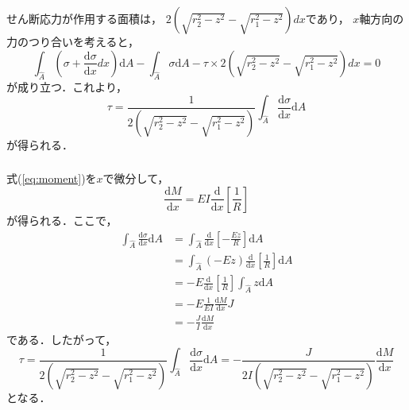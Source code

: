 \documentclass[a4paper]{jsarticle}
\begin{document}
\subsection{}
\subsubsection{}
せん断応力が作用する面積は，
$2\left(\sqrt{r_2^2 - z^2} - \sqrt{r_1^2 - z^2}\right) dx$であり，
$x$軸方向の力のつり合いを考えると，
\begin{equation}
  \int_{\hat{A}} \left(\sigma +
  \frac{\mathrm{d} \sigma}{\mathrm{d} x} d x\right) \mathrm{d}A
  - \int_{\hat{A}} \sigma \mathrm{d} A
  - \tau \times 2\left(\sqrt{r_2^2 - z^2} - \sqrt{r_1^2 - z^2}\right) dx = 0
\end{equation}
が成り立つ．これより，
\begin{equation}
  \tau = \frac{1}{2\left(\sqrt{r_2^2 - z^2} - \sqrt{r_1^2 - z^2}\right)}
  \int_{\hat{A}}
  \frac{\mathrm{d} \sigma}{\mathrm{d} x} \mathrm{d}A
\end{equation}
が得られる．

\subsubsection{}
式(\ref{eq:moment})を$x$で微分して，
\begin{equation}
  \frac{\mathrm{d} M}{\mathrm{d} x} =
  EI \frac{\mathrm{d}}{\mathrm{d} x}
  \left[\frac{1}{R}\right]
\end{equation}
が得られる．ここで，
\begin{equation}
  \begin{aligned}
    \int_{\hat{A}} \frac{\mathrm{d} \sigma}{\mathrm{d} x} \mathrm{d} A
     & = \int_{\hat{A}} \frac{\mathrm{d}}{\mathrm{d} x}
    \left[-\frac{E z}{R}\right] \mathrm{d} A                   \\
     & = \int_{\hat{A}} (-E z) \frac{\mathrm{d}}{\mathrm{d} x}
    \left[\frac{1}{R}\right] \mathrm{d} A                      \\
     & = -E \frac{\mathrm{d}}{\mathrm{d} x}
    \left[\frac{1}{R}\right] \int_{\hat{A}} z \mathrm{d} A     \\
     & = - E \frac{1}{EI} \frac{\mathrm{d} M}{\mathrm{d} x} J  \\
     & = -\frac{J}{I} \frac{\mathrm{d} M}{\mathrm{d} x}
  \end{aligned}
\end{equation}
である．したがって，
\begin{equation}
  \tau = \frac{1}{2\left(\sqrt{r_2^2 - z^2} - \sqrt{r_1^2 - z^2}\right)}
  \int_{\hat{A}}
  \frac{\mathrm{d} \sigma}{\mathrm{d} x} \mathrm{d}A =
  -\frac{J}{2 I\left(\sqrt{r_2^2 - z^2} - \sqrt{r_1^2 - z^2}\right)}
  \frac{\mathrm{d} M}{\mathrm{d} x}
\end{equation}
となる．
\end{document}

